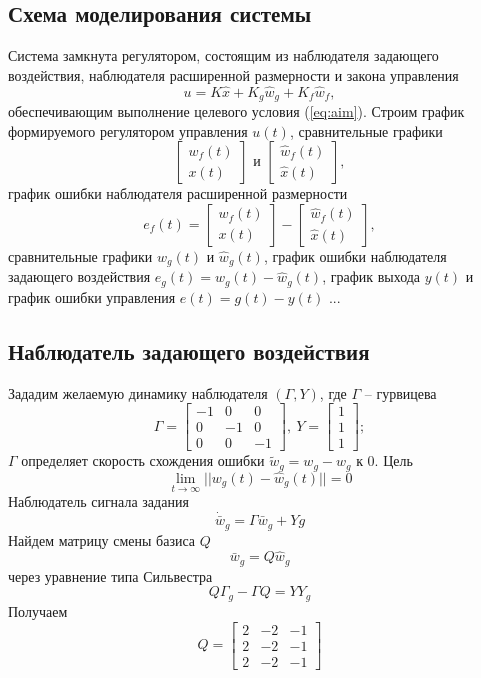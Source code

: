 \documentclass[a4paper, 12pt]{article}
\begin{document}
    \subsection{Схема моделирования системы}
    Система замкнута регулятором,
    состоящим из наблюдателя задающего воздействия,
    наблюдателя расширенной размерности
    и закона управления
    $$
    u=K\hat{x}+K_g\hat{w}_g+K_f\hat{w}_f,
    $$
    обеспечивающим выполнение целевого условия (\ref{eq:aim}).
    Строим график формируемого регулятором
    управления $u(t)$, сравнительные графики
    $$
    \begin{bmatrix}
        w_f(t)\\x(t)
    \end{bmatrix}\text{ и }\begin{bmatrix}
        \hat{w}_f(t)\\ \hat{x}(t)
    \end{bmatrix},
    $$
    график ошибки наблюдателя расширенной размерности
    $$
    e_f(t)=\begin{bmatrix}
        w_f(t)\\x(t)
    \end{bmatrix}-\begin{bmatrix}
        \hat{w}_f(t)\\ \hat{x}(t)
    \end{bmatrix},
    $$
    сравнительные графики $w_g(t)$ и $\hat{w}_g(t)$, график
    ошибки наблюдателя задающего воздействия $e_g(t)=w_g(t)-\hat{w}_g(t)$,
    график выхода $y(t)$ и график ошибки управления $e(t)=g(t)-y(t)$
    ...


    \subsection{Наблюдатель задающего воздействия}
    Зададим желаемую динамику наблюдателя $\left( \Gamma,Y \right)$, где $\Gamma$ -- гурвицева
    $$
    \Gamma=\begin{bmatrix}
        -1 &0 &0\\
        0 &-1 &0\\
        0 &0 &-1
    \end{bmatrix},\ Y=\begin{bmatrix}
        1\\1\\1
    \end{bmatrix};
    $$
    $\Gamma$ определяет скорость схождения ошибки $\tilde{w}_g=w_g-\hat{w}_g$ к 0. Цель
    $$
    \lim\limits_{t\to\infty}||w_g(t)-\hat{w}_g(t)||=0
    $$
    Наблюдатель сигнала задания
    $$
    \dot{\bar{w}}_g=\Gamma\bar{w}_g+Yg
    $$
    Найдем матрицу смены базиса $Q$
    $$
    \bar{w}_g=Q\hat{w}_g
    $$
    через уравнение типа Сильвестра
    $$
    Q\Gamma_g-\Gamma Q=YY_g
    $$
    Получаем
    $$
    Q=\begin{bmatrix}
    2    &-2    &-1\\
     2    &-2    &-1\\
     2    &-2    &-1
    \end{bmatrix}
    $$
\end{document}
